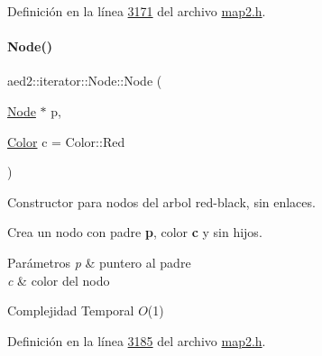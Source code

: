Definición en la línea \hyperlink{map2_8h_source_l03171}{3171} del archivo \hyperlink{map2_8h_source}{map2.\+h}.

\mbox{\label{structaed2_1_1iterator_1_1Node_a1f7307020ba416915f60d2dd938df845_a1f7307020ba416915f60d2dd938df845}} 
\paragraph{\texorpdfstring{Node()}{Node()}\hspace{0.1cm}{\footnotesize\ttfamily [2/2]}}
{\footnotesize\ttfamily aed2\+::iterator\+::\+Node\+::\+Node (\begin{DoxyParamCaption}\item[{\hyperlink{structaed2_1_1iterator_1_1Node}{Node} $\ast$}]{p,  }\item[{\hyperlink{classaed2_1_1iterator_aaa188f82ba585d8de525b1400242cf4f_aaa188f82ba585d8de525b1400242cf4f}{Color}}]{c = {\ttfamily Color\+:\+:Red} }\end{DoxyParamCaption})\hspace{0.3cm}{\ttfamily [inline]}}



Constructor para nodos del arbol red-\/black, sin enlaces. 

Crea un nodo con padre {\bfseries p}, color {\bfseries c} y sin hijos.


\begin{DoxyParams}{Parámetros}
{\em p} & puntero al padre \\
\hline
{\em c} & color del nodo\\
\hline
\end{DoxyParams}

\begin{DoxyDescription}
\item[Complejidad Temporal]$O$(1)
\end{DoxyDescription}

Definición en la línea \hyperlink{map2_8h_source_l03185}{3185} del archivo \hyperlink{map2_8h_source}{map2.\+h}.

\mbox{\label{structaed2_1_1iterator_1_1Node_ab9a8f2970d15b72a4d1d20f8bf853d4b_ab9a8f2970d15b72a4d1d20f8bf853d4b}} 
